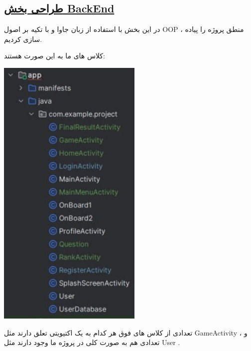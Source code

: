 \subsection*{\underline{طراحی بخش BackEnd}}
در این بخش با استفاده از زبان جاوا و با تکیه بر اصول OOP ، منطق پروژه را پیاده سازی کردیم. 

کلاس های ما به این صورت هستند:

\qquad \qquad \qquad \qquad \qquad  \qquad \qquad \includegraphics[width=0.3\linewidth]{screenshot006}


تعدادی از کلاس های فوق هر کدام به یک اکتیویتی تعلق دارند مثل GameActivity ، و تعدادی هم به صورت کلی در پروژه ما وجود دارند مثل User .
